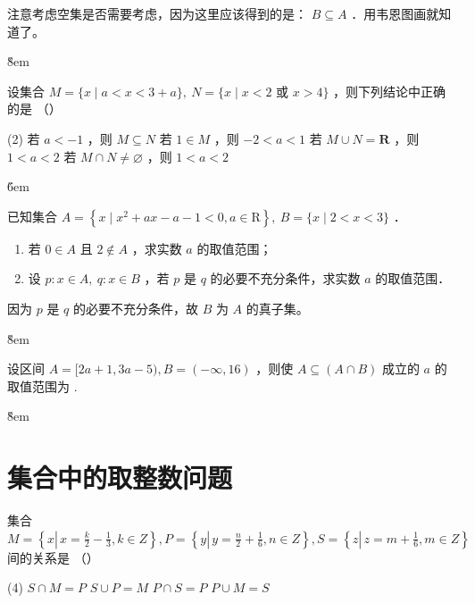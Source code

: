 \begin{warning}
    注意考虑空集是否需要考虑，因为这里应该得到的是： $B \subseteq A$ ．用韦恩图画就知道了。
\end{warning}

\v{8em}

\begin{example}
    设集合 $M=\{x \mid a<x<3+a\}, ~ N=\{x \mid x<2$ 或 $x>4\}$ ，则下列结论中正确的是 （\qquad）
    \begin{tasks}(2)
        \task 若 $a<-1$ ，则 $M \subseteq N$
        \task 若 $1 \in M$ ，则 $-2<a<1$
        \task 若 $M \cup N=\mathbf{R}$ ，则 $1<a<2$
        \task 若 $M \cap N \neq \varnothing$ ，则 $1<a<2$
    \end{tasks}
\end{example}

\v{6em}

\begin{example}
    已知集合 $A=\left\{x \mid x^2+a x-a-1<0, a \in \mathrm{R}\right\}, ~ B=\{x \mid 2<x<3\}$ ．
    \begin{enumerate}
        \item 若 $0 \in A$ 且 $2 \notin A$ ，求实数 $a$ 的取值范围；
        \item 设 $p: x \in A, ~ q: x \in B$ ，若 $p$ 是 $q$ 的必要不充分条件，求实数 $a$ 的取值范围．
    \end{enumerate}
\end{example}

\begin{tips}
    因为 $p$ 是 $q$ 的必要不充分条件，故 $B$ 为 $A$ 的真子集。
\end{tips}

\v{8em}

\begin{example}
    设区间 $A=[2 a+1,3 a-5), B=(-\infty, 16)$ ，则使 $A \subseteq(A \cap B)$ 成立的 $a$ 的取值范围为 \underline{\qquad}.
\end{example}

\v{8em}

\section{集合中的取整数问题}

\begin{example}
    集合 $M=\left\{x \left\lvert\, x=\frac{k}{2}-\frac{1}{3}\right., k \in Z\right\}, P=\left\{y \left\lvert\, y=\frac{n}{2}+\frac{1}{6}\right., n \in Z\right\}, S=\left\{z \left\lvert\, z=m+\frac{1}{6}\right., m \in Z\right\}$ 间的关系是 （\qquad）
    \begin{tasks}(4)
        \task $S \cap M=P$
        \task $S \cup P=M$
        \task $P \cap S=P$
        \task $P \cup M=S$
    \end{tasks}
\end{example}

